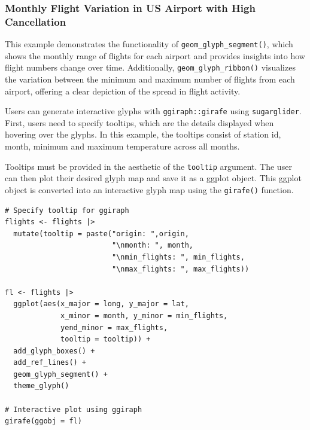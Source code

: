 \hypertarget{monthly-flight-variation-in-us-airport-with-high-cancellation}{%
\subsubsection{Monthly Flight Variation in US Airport with High Cancellation}\label{monthly-flight-variation-in-us-airport-with-high-cancellation}}

This example demonstrates the functionality of \texttt{geom\_glyph\_segment()}, which shows the monthly range of flights for each airport and provides insights into how flight numbers change over time. Additionally, \texttt{geom\_glyph\_ribbon()} visualizes the variation between the minimum and maximum number of flights from each airport, offering a clear depiction of the spread in flight activity.

Users can generate interactive glyphs with \texttt{ggiraph::girafe} using \texttt{sugarglider}. First, users need to specify tooltips, which are the details displayed when hovering over the glyphs. In this example, the tooltips consist of station id, month, minimum and maximum temperature across all months.

Tooltips must be provided in the aesthetic of the \texttt{tooltip} argument. The user can then plot their desired glyph map and save it as a ggplot object. This ggplot object is converted into an interactive glyph map using the \texttt{girafe()} function.

\begin{verbatim}
# Specify tooltip for ggiraph 
flights <- flights |>
  mutate(tooltip = paste("origin: ",origin,
                         "\nmonth: ", month,
                         "\nmin_flights: ", min_flights,
                         "\nmax_flights: ", max_flights))

fl <- flights |> 
  ggplot(aes(x_major = long, y_major = lat,
             x_minor = month, y_minor = min_flights,
             yend_minor = max_flights,
             tooltip = tooltip)) + 
  add_glyph_boxes() +
  add_ref_lines() +
  geom_glyph_segment() +
  theme_glyph()

# Interactive plot using ggiraph
girafe(ggobj = fl)
\end{verbatim}

